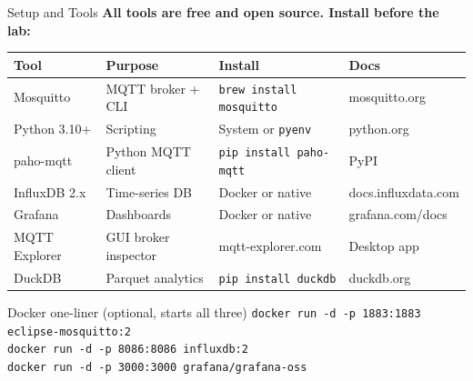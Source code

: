 \documentclass[aspectratio=169,11pt]{beamer}
\begin{document}
\begin{frame}{Setup and Tools}
    \textbf{All tools are free and open source. Install before the lab:}

    \vspace{0.2cm}
    \begin{center}
    \footnotesize
    \begin{tabular}{llll}
        \toprule
        \textbf{Tool} & \textbf{Purpose} & \textbf{Install} & \textbf{Docs} \\
        \midrule
        Mosquitto & MQTT broker + CLI & \texttt{brew install mosquitto} & mosquitto.org \\
        Python 3.10+ & Scripting & System or \texttt{pyenv} & python.org \\
        paho-mqtt & Python MQTT client & \texttt{pip install paho-mqtt} & PyPI \\
        InfluxDB 2.x & Time-series DB & Docker or native & docs.influxdata.com \\
        Grafana & Dashboards & Docker or native & grafana.com/docs \\
        MQTT Explorer & GUI broker inspector & mqtt-explorer.com & Desktop app \\
        DuckDB & Parquet analytics & \texttt{pip install duckdb} & duckdb.org \\
        \bottomrule
    \end{tabular}
    \normalsize
    \end{center}

    \vspace{0.2cm}
    \begin{exampleblock}{Docker one-liner (optional, starts all three)}
        \texttt{\scriptsize docker run -d -p 1883:1883 eclipse-mosquitto:2}\\
        \texttt{\scriptsize docker run -d -p 8086:8086 influxdb:2}\\
        \texttt{\scriptsize docker run -d -p 3000:3000 grafana/grafana-oss}
    \end{exampleblock}
\end{frame}
\end{document}
